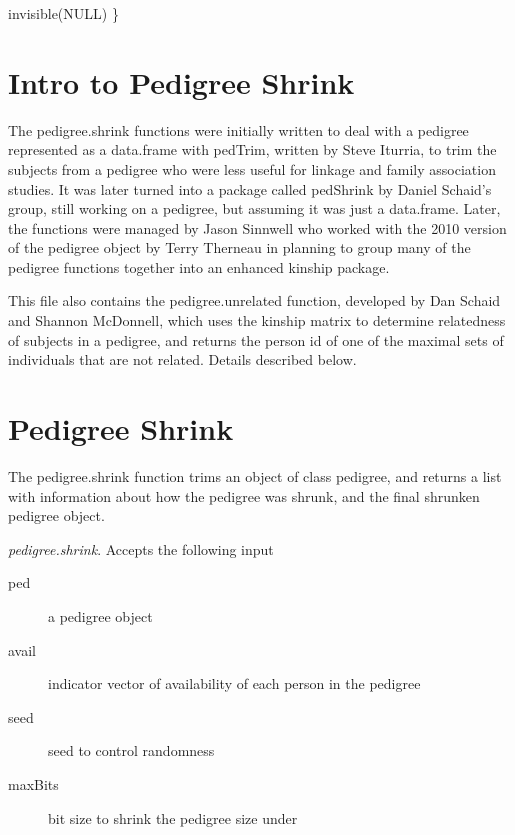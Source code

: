 \documentclass{article}
\begin{document}
    invisible(NULL)
\}
\nwendcode{}\nwdocspar






\section{Intro to Pedigree Shrink}

The pedigree.shrink functions were initially written to deal with a pedigree
represented as a data.frame with pedTrim, written by Steve Iturria, to trim 
the subjects from a pedigree who were less useful for linkage and family 
association studies.  It was later turned into a package called pedShrink 
by Daniel Schaid's group, still working on a pedigree, but assuming it was 
just a data.frame.  Later, the functions were managed by Jason Sinnwell who 
worked with the 2010 version of the pedigree object by Terry Therneau in 
planning to group many of the pedigree functions together into an enhanced 
kinship package.

This file also contains the pedigree.unrelated function, developed by Dan 
Schaid and Shannon McDonnell, which uses the kinship matrix to 
determine relatedness of subjects in a pedigree, and returns the person id
of one of the maximal sets of individuals that are not related. 
Details described below.


\section{Pedigree Shrink}
The pedigree.shrink function trims an object of class pedigree, and 
returns a list with information about how the pedigree was shrunk, 
and the final shrunken pedigree object.

\emph{pedigree.shrink}.  
Accepts the following input
\begin{description}
  \item[ped] a pedigree object
  \item[avail] indicator vector of availability of each person in the pedigree
  \item[seed] seed to control randomness
  \item[maxBits] bit size to shrink the pedigree size under
\end{description}

\nwenddocs{}\endmoddef
\end{document}
